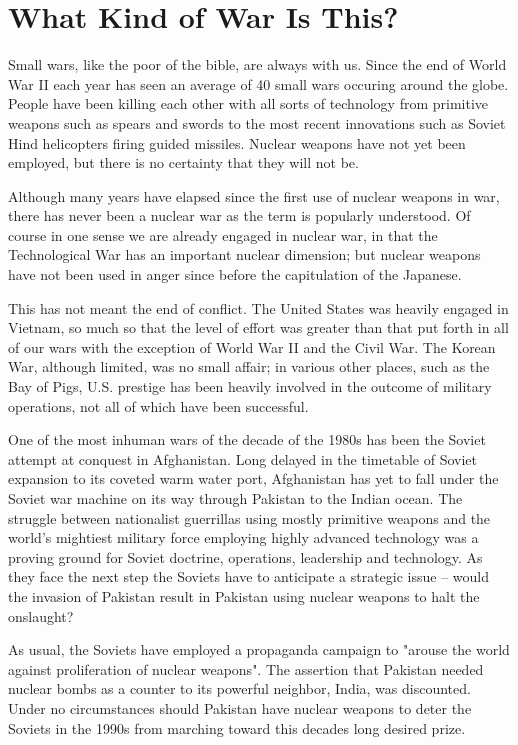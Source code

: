 \chapter{What Kind of War Is This?}
Small wars, like the poor of the bible, are always with us. Since the end of World War II each year has seen an average of 40 small wars occuring around the globe. People have been killing each other with all sorts of technology from primitive weapons such as spears and swords to the most recent innovations such as Soviet Hind helicopters firing guided missiles. Nuclear weapons have not yet been employed, but there is no certainty that they will not be.

Although many years have elapsed since the first use of nuclear weapons in war, there has never been a nuclear war as the term is popularly understood. Of course in one sense we are already engaged in nuclear war, in that the Technological War has an important nuclear dimension; but nuclear weapons have not been used in anger since before the capitulation of the Japanese.

This has not meant the end of conflict. The United States was heavily engaged in Vietnam, so much so that the level of effort was greater than that put forth in all of our wars with the exception of World War II and the Civil War. The Korean War, although limited, was no small affair; in various other places, such as the Bay of Pigs, U.S. prestige has been heavily involved in the outcome of military operations, not all of which have been successful.

One of the most inhuman wars of the decade of the 1980s has been the Soviet attempt at conquest in Afghanistan. Long delayed in the timetable of Soviet expansion to its coveted warm water port, Afghanistan has yet to fall under the Soviet war machine on its way through Pakistan to the Indian ocean. The struggle between nationalist guerrillas using mostly primitive weapons and the world's mightiest military force employing highly advanced technology was a proving ground for Soviet doctrine, operations, leadership and technology. As they face the next step the Soviets have to anticipate a strategic issue -- would the invasion of Pakistan result in Pakistan using nuclear weapons to halt the onslaught?

As usual, the Soviets have employed a propaganda campaign to "arouse the world against proliferation of nuclear weapons". The assertion that Pakistan needed nuclear bombs as a counter to its powerful neighbor, India, was discounted. Under no circumstances should Pakistan have nuclear weapons to deter the Soviets in the 1990s from marching toward this decades long desired prize.

